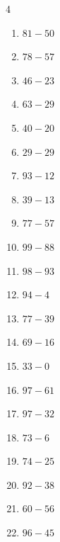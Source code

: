 \begin{multicols}{4}
\begin{enumerate}
  \item $81-50$
        \phantom{$=31$}

  \item $78-57$
        \phantom{$=21$}

  \item $46-23$
        \phantom{$=23$}

  \item $63-29$
        \phantom{$=34$}

  \item $40-20$
        \phantom{$=20$}

  \item $29-29$
        \phantom{$=0$}

  \item $93-12$
        \phantom{$=81$}

  \item $39-13$
        \phantom{$=26$}

  \item $77-57$
        \phantom{$=20$}

  \item $99-88$
        \phantom{$=11$}

  \item $98-93$
        \phantom{$=5$}

\columnbreak %

  \item $94-4$
        \phantom{$=90$}

  \item $77-39$
        \phantom{$=38$}

  \item $69-16$
        \phantom{$=53$}

  \item $33-0$
        \phantom{$=33$}

  \item $97-61$
        \phantom{$=36$}

  \item $97-32$
        \phantom{$=65$}

  \item $73-6$
        \phantom{$=67$}

  \item $74-25$
        \phantom{$=49$}

  \item $92-38$
        \phantom{$=54$}

  \item $60-56$
        \phantom{$=4$}

  \item $96-45$
        \phantom{$=51$}


\end{enumerate}
\end{multicols}

